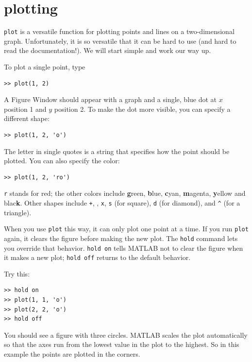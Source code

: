 \documentclass{book}
\begin{document}
\section{plotting}
\label{plotting}

{\tt plot} is a versatile function for plotting points and lines
on a two-dimensional graph.  Unfortunately, it is so versatile
that it can be hard to use (and hard to read the documentation!).
We will start simple and work our way up.

To plot a single point, type

\begin{verbatim}
>> plot(1, 2)
\end{verbatim}

A {\sf Figure Window} should appear with a graph and a single, blue dot
at $x$ position 1 and $y$ position 2.  To make the dot more visible,
you can specify a different shape:

\begin{verbatim}
>> plot(1, 2, 'o')
\end{verbatim}

The letter in single quotes is a string that specifies how the
point should be plotted.  You can also specify the color:

\begin{verbatim}
>> plot(1, 2, 'ro')
\end{verbatim}

{\tt r} stands for red; the other colors include {\bf g}reen, {\bf
b}lue, {\bf c}yan, {\bf m}agenta, {\bf y}ellow and blac{\bf k}.
Other shapes include {\tt +}, 
{\tt *}, 
{\tt x}, 
{\tt s} (for square), 
{\tt d} (for diamond), and 
\verb+^+ (for a triangle). 

When you use {\tt plot} this way, it can only plot one point at a
time.  If you run {\tt plot} again, it clears the figure before making
the new plot.  The {\tt hold} command lets you override that behavior.
{\tt hold on} tells MATLAB not to clear the figure when it makes a new
plot; {\tt hold off} returns to the default behavior.

Try this:

\begin{verbatim}
>> hold on
>> plot(1, 1, 'o')
>> plot(2, 2, 'o')
>> hold off
\end{verbatim}

You should see a figure with three circles.  MATLAB scales
the plot automatically so that the axes run from the lowest value in
the plot to the highest.  So in this example the points are plotted in
the corners.
\end{document}
